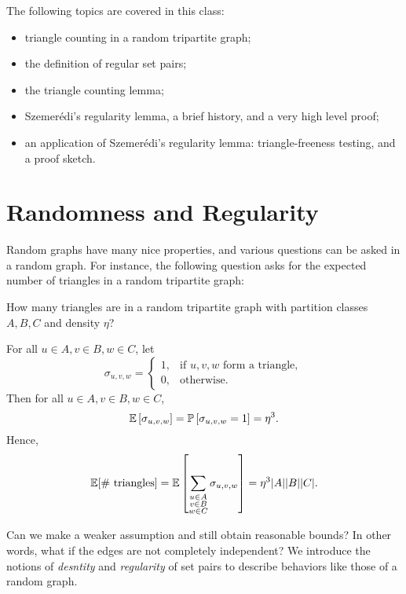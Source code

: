 \documentclass[10pt]{article}
\begin{document}


The following topics are covered in this class:
\begin{itemize}[itemsep=0pt]
  \item triangle counting in a random tripartite graph;
  \item the definition of regular set pairs;
  \item the triangle counting lemma;
  \item Szemer\'edi's regularity lemma, a brief history, and a very high level proof;
  \item an application of Szemer\'edi's regularity lemma: triangle-freeness testing, and a proof sketch.
\end{itemize}

\section{Randomness and Regularity}

Random graphs have many nice properties, and various questions can be asked in a random graph. For instance, the following question asks for the expected number of triangles in a random tripartite graph:

\begin{problem}
  How many triangles are in a random tripartite graph with partition classes $A, B, C$ and density $\eta$?
\end{problem}

For all $u \in A, v \in B, w \in C$, let
$$ \sigma_{u, v, w} = \left\{
  \begin{array}{ll}
    1, & \text{if $u, v, w$ form a triangle}, \\
    0, & \text{otherwise}.
  \end{array}
\right. $$
Then for all $u \in A, v \in B, w \in C$,
$$ \mathop{{}\mathbb{E}}\left[\sigma_{u, v, w}\right] = \mathop{{}\mathbb{P}}\left[\sigma_{u, v, w} = 1\right] = \eta^3. $$
Hence,
$$ \mathop{{}\mathbb{E}}[\text{\# triangles}] = \mathop{{}\mathbb{E}}\left[\sum_{\substack{u \in A \\ v \in B \\ w \in C}} \sigma_{u, v, w}\right] = \eta^3 |A| |B| |C|. $$

Can we make a weaker assumption and still obtain reasonable bounds? In other words, what if the edges are not completely independent? We introduce the notions of \emph{desntity} and \emph{regularity} of set pairs to describe behaviors like those of a random graph.
\end{document}
